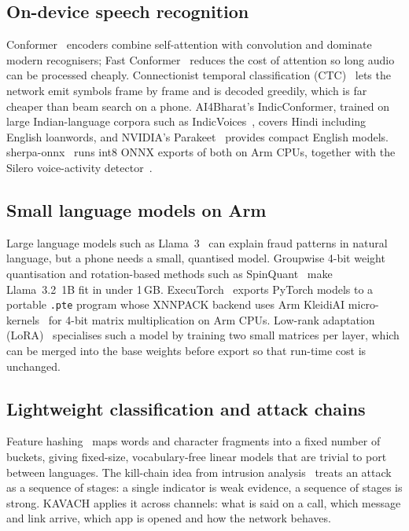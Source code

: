 \documentclass[conference]{IEEEtran}
\begin{document}
\subsection{On-device speech recognition}
Conformer~\cite{conformer} encoders combine self-attention with convolution and dominate modern recognisers; Fast Conformer~\cite{fastconformer} reduces the cost of attention so long audio can be processed cheaply. Connectionist temporal classification (CTC)~\cite{ctc} lets the network emit symbols frame by frame and is decoded greedily, which is far cheaper than beam search on a phone. AI4Bharat's IndicConformer, trained on large Indian-language corpora such as IndicVoices~\cite{indicvoices}, covers Hindi including English loanwords, and NVIDIA's Parakeet~\cite{parakeet} provides compact English models. sherpa-onnx~\cite{sherpa} runs int8 ONNX exports of both on Arm CPUs, together with the Silero voice-activity detector~\cite{silero}.

\subsection{Small language models on Arm}
Large language models such as Llama~3~\cite{llama3} can explain fraud patterns in natural language, but a phone needs a small, quantised model. Groupwise 4-bit weight quantisation and rotation-based methods such as SpinQuant~\cite{spinquant} make Llama~3.2~1B fit in under 1\,GB. ExecuTorch~\cite{executorch} exports PyTorch models to a portable \texttt{.pte} program whose XNNPACK backend uses Arm KleidiAI micro-kernels~\cite{kleidiai} for 4-bit matrix multiplication on Arm CPUs. Low-rank adaptation (LoRA)~\cite{lora} specialises such a model by training two small matrices per layer, which can be merged into the base weights before export so that run-time cost is unchanged.

\subsection{Lightweight classification and attack chains}
Feature hashing~\cite{hashing} maps words and character fragments into a fixed number of buckets, giving fixed-size, vocabulary-free linear models that are trivial to port between languages. The kill-chain idea from intrusion analysis~\cite{killchain} treats an attack as a sequence of stages: a single indicator is weak evidence, a sequence of stages is strong. KAVACH applies it across channels: what is said on a call, which message and link arrive, which app is opened and how the network behaves.
\end{document}
